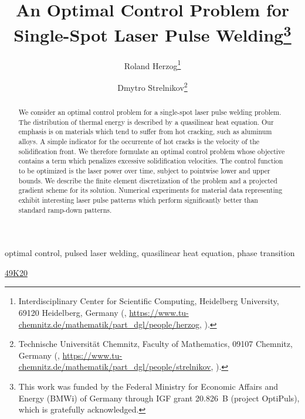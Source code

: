 \documentclass{numapde-preprint}
\title{An Optimal Control Problem for Single-Spot Laser Pulse Welding\thanks{This work was funded by the Federal Ministry for Economic Affairs and Energy (BMWi) of Germany through IGF grant 20.826~B (project OptiPuls), which is gratefully acknowledged.}}
\subtitle{}
\author{Roland Herzog\thanks{Interdisciplinary Center for Scientific Computing, Heidelberg University, 69120 Heidelberg, Germany (\email{roland.herzog@mathematik.tu-chemnitz.de}, \url{https://www.tu-chemnitz.de/mathematik/part_dgl/people/herzog}, \orcid{0000-0003-2164-6575}).}
\and
Dmytro Strelnikov\thanks{Technische Universität Chemnitz, Faculty of Mathematics, 09107 Chemnitz, Germany (\email{dmytro.strelnikov@mathematik.tu-chemnitz.de}, \url{https://www.tu-chemnitz.de/mathematik/part_dgl/people/strelnikov}, \orcid{0000-0002-7668-3640}).}}
\begin{document}
\maketitle

\begin{abstract}
We consider an optimal control problem for a single-spot laser pulse welding problem.
The distribution of thermal energy is described by a quasilinear heat equation.
Our emphasis is on materials which tend to suffer from hot cracking, such as aluminum alloys.
A simple indicator for the occurrente of hot cracks is the velocity of the solidification front.
We therefore formulate an optimal control problem whose objective contains a term which penalizes excessive solidification velocities.
The control function to be optimized is the laser power over time, subject to pointwise lower and upper bounds.
We describe the finite element discretization of the problem and a projected gradient scheme for its solution.
Numerical experiments for material data representing  exhibit interesting laser pulse patterns which perform significantly better than standard ramp-down patterns.\end{abstract}

\begin{keywords}
optimal control, pulsed laser welding, quasilinear heat equation, phase transition\end{keywords}

\begin{AMS}
\href{https://mathscinet.ams.org/msc/msc2010.html?t=49K20}{49K20}
\end{AMS}



\printbibliography
\end{document}
